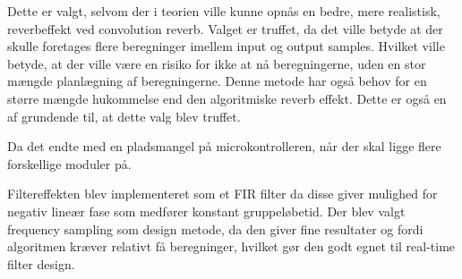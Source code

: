 Dette er valgt, selvom der i teorien ville kunne opnås en bedre, mere realistisk, reverbeffekt ved convolution reverb.
Valget er truffet, da det ville betyde at der skulle foretages flere beregninger imellem input og output samples.
Hvilket ville betyde, at der ville være en risiko for ikke at nå beregningerne, uden en stor mængde planlægning af beregningerne.
Denne metode har også behov for en større mængde hukommelse end den algoritmiske reverb effekt.
Dette er også en af grundende til, at dette valg blev truffet. 

Da det endte med en pladsmangel på microkontrolleren, når der skal ligge flere forskellige moduler på.

Filtereffekten blev implementeret som et FIR filter da disse giver mulighed for negativ lineær fase som medfører konstant gruppeløbetid.
Der blev valgt frequency sampling som design metode, da den giver fine resultater og fordi algoritmen kræver relativt få beregninger, hvilket gør den godt egnet til real-time filter design.


